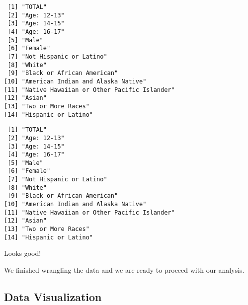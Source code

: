 \documentclass[
]{article}
\newenvironment{Shaded}{\begin{snugshade}}{\end{snugshade}}
\newcommand{\KeywordTok}[1]{\textcolor[rgb]{0.13,0.29,0.53}{\textbf{#1}}}
\newcommand{\NormalTok}[1]{#1}
\newcommand{\OperatorTok}[1]{\textcolor[rgb]{0.81,0.36,0.00}{\textbf{#1}}}
\newcommand{\StringTok}[1]{\textcolor[rgb]{0.31,0.60,0.02}{#1}}
\begin{document}
\begin{verbatim}
 [1] "TOTAL"                                    
 [2] "Age: 12-13"                               
 [3] "Age: 14-15"                               
 [4] "Age: 16-17"                               
 [5] "Male"                                     
 [6] "Female"                                   
 [7] "Not Hispanic or Latino"                   
 [8] "White"                                    
 [9] "Black or African American"                
[10] "American Indian and Alaska Native"        
[11] "Native Hawaiian or Other Pacific Islander"
[12] "Asian"                                    
[13] "Two or More Races"                        
[14] "Hispanic or Latino"                       
\end{verbatim}

\begin{Shaded}
\end{Shaded}

\begin{verbatim}
 [1] "TOTAL"                                    
 [2] "Age: 12-13"                               
 [3] "Age: 14-15"                               
 [4] "Age: 16-17"                               
 [5] "Male"                                     
 [6] "Female"                                   
 [7] "Not Hispanic or Latino"                   
 [8] "White"                                    
 [9] "Black or African American"                
[10] "American Indian and Alaska Native"        
[11] "Native Hawaiian or Other Pacific Islander"
[12] "Asian"                                    
[13] "Two or More Races"                        
[14] "Hispanic or Latino"                       
\end{verbatim}

Looks good!

We finished wrangling the data and we are ready to proceed with our
analysis.

\hypertarget{data-visualization}{%
\subsection{\texorpdfstring{\textbf{Data
Visualization}}{Data Visualization}}\label{data-visualization}}
\end{document}

